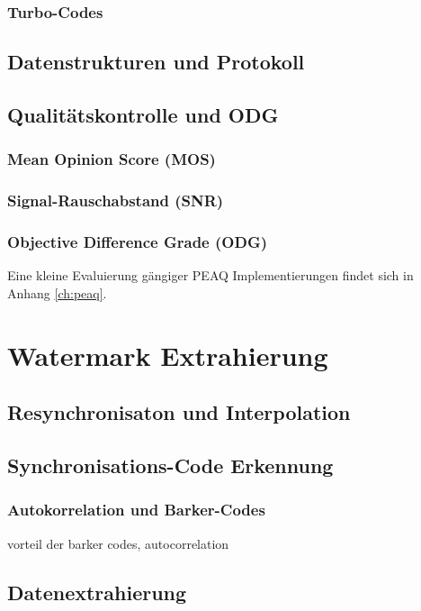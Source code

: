 \subsubsection{Turbo-Codes}

\subsection{Datenstrukturen und Protokoll}
\label{sec:protokoll}

\subsection{Qualitätskontrolle und ODG }
\label{sec:qualitaetskontrolle}

\subsubsection{Mean Opinion Score (MOS)}

\cite{??}

\subsubsection{Signal-Rauschabstand (SNR)} 

\subsubsection{Objective Difference Grade (ODG)} 

Eine kleine Evaluierung gängiger PEAQ Implementierungen findet sich in Anhang \ref{ch:peaq}.


\section{Watermark Extrahierung}
\label{sec:extraction}


\subsection{Resynchronisaton und Interpolation}

\subsection{Synchronisations-Code Erkennung}

\subsubsection{Autokorrelation und Barker-Codes} 
\label{sec:barkercode}


vorteil der barker codes, autocorrelation

\subsection{Datenextrahierung}



